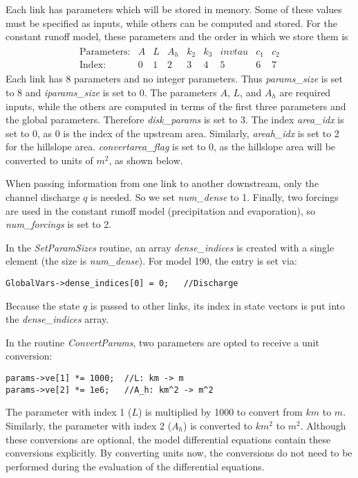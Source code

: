 \documentclass[12pt]{article}
\begin{document}
Each link has parameters which will be stored in memory. Some of these values must be specified as inputs, while others can be computed and stored. For the constant runoff model, these parameters and the order in which we store them is
\begin{align*}
 \begin{array}{ccccccccc}
    \mbox{Parameters:} &  A  &  L  &  A_h  &  k_2  &  k_3  &  invtau  &  c_1  &  c_2  \\
    \mbox{Index:} & 0 & 1 & 2 & 3 & 4 & 5 & 6 & 7
 \end{array}
\end{align*}
Each link has 8 parameters and no integer parameters. Thus \emph{params\_size} is set to 8 and \emph{iparams\_size} is set to 0. The parameters $A$, $L$, and $A_h$ are required inputs, while the others are computed in terms of the first three parameters and the global parameters. Therefore \emph{disk\_params} is set to 3. The index \emph{area\_idx} is set to 0, as 0 is the index of the upstream area. Similarly, \emph{areah\_idx} is set to 2 for the hillslope area. \emph{convertarea\_flag} is set to 0, as the hillslope area will be converted to units of $m^2$, as shown below.

When passing information from one link to another downstream, only the channel discharge $q$ is needed. So we set \emph{num\_dense} to 1. Finally, two forcings are used in the constant runoff model (precipitation and evaporation), so \emph{num\_forcings} is set to 2.

In the \emph{SetParamSizes} routine, an array \emph{dense\_indices} is created with a single element (the size is \emph{num\_dense}). For model 190, the entry is set via:
\begin{lstlisting}[style=CStyle]
GlobalVars->dense_indices[0] = 0;	//Discharge
\end{lstlisting}
Because the state $q$ is passed to other links, its index in state vectors is put into the \emph{dense\_indices} array.

In the routine \emph{ConvertParams}, two parameters are opted to receive a unit conversion:
\begin{lstlisting}[style=CStyle]
params->ve[1] *= 1000;	//L: km -> m
params->ve[2] *= 1e6;	//A_h: km^2 -> m^2
\end{lstlisting}
The parameter with index 1 ($L$) is multiplied by 1000 to convert from $km$ to $m$. Similarly, the parameter with index 2 ($A_h$) is converted to $km^2$ to $m^2$. Although these conversions are optional, the model differential equations contain these conversions explicitly. By converting units now, the conversions do not need to be performed during the evaluation of the differential equations.
\end{document}
